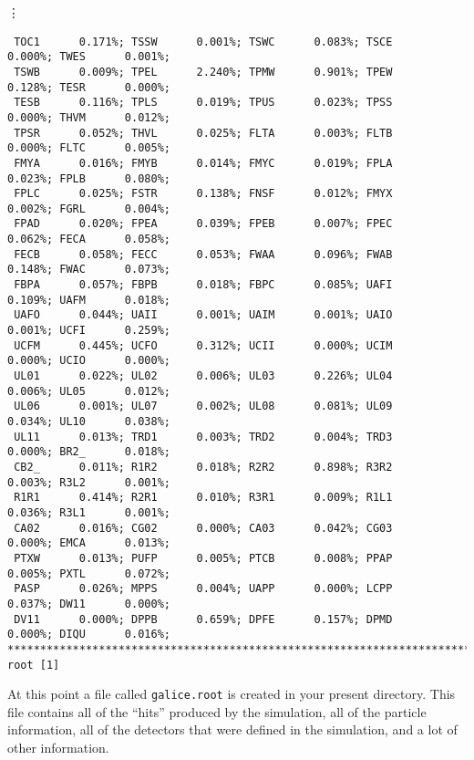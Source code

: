 \vdots
\begin{verbatim}
 TOC1      0.171%; TSSW      0.001%; TSWC      0.083%; TSCE      0.000%; TWES      0.001%;
 TSWB      0.009%; TPEL      2.240%; TPMW      0.901%; TPEW      0.128%; TESR      0.000%;
 TESB      0.116%; TPLS      0.019%; TPUS      0.023%; TPSS      0.000%; THVM      0.012%;
 TPSR      0.052%; THVL      0.025%; FLTA      0.003%; FLTB      0.000%; FLTC      0.005%;
 FMYA      0.016%; FMYB      0.014%; FMYC      0.019%; FPLA      0.023%; FPLB      0.080%;
 FPLC      0.025%; FSTR      0.138%; FNSF      0.012%; FMYX      0.002%; FGRL      0.004%;
 FPAD      0.020%; FPEA      0.039%; FPEB      0.007%; FPEC      0.062%; FECA      0.058%;
 FECB      0.058%; FECC      0.053%; FWAA      0.096%; FWAB      0.148%; FWAC      0.073%;
 FBPA      0.057%; FBPB      0.018%; FBPC      0.085%; UAFI      0.109%; UAFM      0.018%;
 UAFO      0.044%; UAII      0.001%; UAIM      0.001%; UAIO      0.001%; UCFI      0.259%;
 UCFM      0.445%; UCFO      0.312%; UCII      0.000%; UCIM      0.000%; UCIO      0.000%;
 UL01      0.022%; UL02      0.006%; UL03      0.226%; UL04      0.006%; UL05      0.012%;
 UL06      0.001%; UL07      0.002%; UL08      0.081%; UL09      0.034%; UL10      0.038%;
 UL11      0.013%; TRD1      0.003%; TRD2      0.004%; TRD3      0.000%; BR2_      0.018%;
 CB2_      0.011%; R1R2      0.018%; R2R2      0.898%; R3R2      0.003%; R3L2      0.001%;
 R1R1      0.414%; R2R1      0.010%; R3R1      0.009%; R1L1      0.036%; R3L1      0.001%;
 CA02      0.016%; CG02      0.000%; CA03      0.042%; CG03      0.000%; EMCA      0.013%;
 PTXW      0.013%; PUFP      0.005%; PTCB      0.008%; PPAP      0.005%; PXTL      0.072%;
 PASP      0.026%; MPPS      0.004%; UAPP      0.000%; LCPP      0.037%; DW11      0.000%;
 DV11      0.000%; DPPB      0.659%; DPFE      0.157%; DPMD      0.000%; DIQU      0.016%;
***************************************************************************
root [1] 
\end{verbatim}

At this point a file called \texttt{galice.root} is created in your present
directory. This file contains all of the ``hits'' produced by the simulation,
all of the particle information, all of the detectors that were defined in the
simulation, and a lot of other information.
